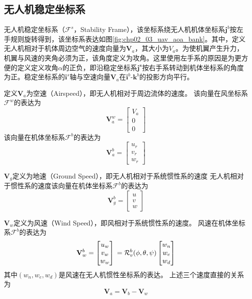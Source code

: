 \subsection{无人机稳定坐标系}
无人机稳定坐标系（$\mathcal{F}^s$，Stability Frame），该坐标系绕无人机机体坐标系$\mathbf{j}^b$按左手规则旋转得到，该坐标系表达如图\ref{fig:chp02_03_uav_aoa_bank}。其中，定义无人机相对于机体周边空气的速度向量为$\mathbf{V}_a$，其大小为$V_a$。为使机翼产生升力，机翼与风速的夹角必须为正，该角度定义为攻角。这里使用左手系的原因是为更方便的定义定义攻角$\alpha$的正负，即沿稳定坐标系$\mathbf{j^s}$按右手系转动到机体坐标系的角度为正。稳定坐标系的$\mathbf{i}^s$轴与空速向量$\mathbf{V}_a$在$\mathbf{i}^b$-$\mathbf{k}^b$的投影方向平行。

定义$\mathbf{V}_a$为空速（Airspeed），即无人机相对于周边流体的速度。
该向量在风坐标系$\mathcal{F}^w$的表达为
\begin{equation} 
\mathbf{V}_a^w=\begin{bmatrix} V_a \\ 0 \\ 0 \end{bmatrix}
\end{equation}
该向量在机体坐标系$\mathcal{F}^b$的表达为
\begin{equation} 
\mathbf{V}_a^b = \begin{bmatrix} u_r \\ v_r \\ w_r \end{bmatrix}
\end{equation}

$\mathbf{V}_g$定义为地速（Ground Speed），即无人机相对于系统惯性系的速度
无人机相对于惯性系的速度该向量在机体坐标系$\mathcal{F}^b$的表达为
\begin{equation}
\mathbf{V}_g^b=\begin{bmatrix} u \\ v \\w \end{bmatrix}
\end{equation}

$\mathbf{V}_w$定义为风速（Wind Speed），即风相对于系统惯性系的速度。
风速在机体坐标系$\mathcal{F}^b$的表达为
\begin{equation}
\mathbf{V}_w^b=\begin{bmatrix} u_w \\ v_w \\w_w \end{bmatrix} \\
=\mathcal{R}_v^b(\phi, \theta, \psi) \begin{bmatrix} w_n \\ w_e \\ w_d \end{bmatrix}
\end{equation}
其中$(w_n, w_e, w_d)$是风速在无人机惯性坐标系的表达。
上述三个速度直接的关系为
\begin{equation}
\mathbf{V}_a = \mathbf{V}_b - \mathbf{V}_w
\end{equation}

